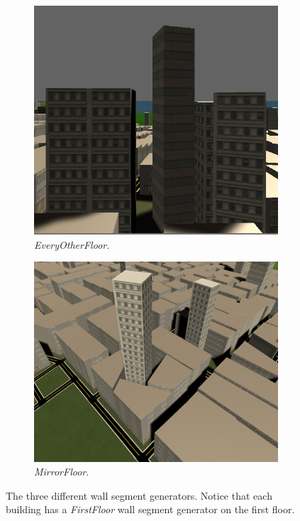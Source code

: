   \begin{figure}[H]
    \centering
  
    \begin{subfigure}[b]{0.45\textwidth}
      \includegraphics[width=\textwidth]{figure/skyscraper-close-up.PNG}
      \caption{\textit{EveryOtherFloor}.}
    \end{subfigure}
    \quad
    \begin{subfigure}[b]{0.45\textwidth}
      \includegraphics[width=\textwidth]{figure/wack.PNG}
      \caption{\textit{MirrorFloor}.}
    \end{subfigure}
    
    \caption{The three different wall segment generators. Notice that each building has a \textit{FirstFloor} wall segment generator on the first floor.}
    \label{fig:skyscraper-result}
  \end{figure}
  

